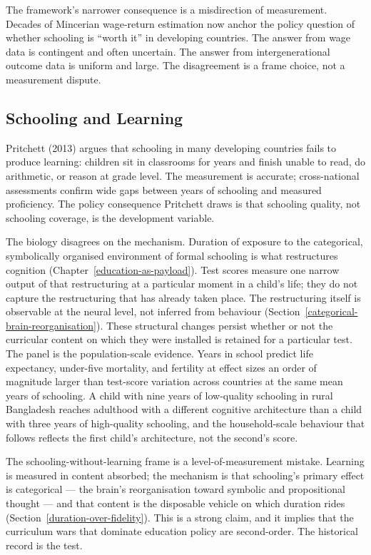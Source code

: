 \documentclass[12pt,letterpaper]{article}
\begin{document}
{The framework's narrower consequence is a misdirection of measurement. Decades of Mincerian wage-return estimation now anchor the policy question of whether schooling is ``worth it'' in developing countries. The answer from wage data is contingent and often uncertain. The answer from intergenerational outcome data is uniform and large. The disagreement is a frame choice, not a measurement dispute.

\subsection{Schooling and Learning}\label{schooling-and-learning}

Pritchett (2013) argues that schooling in many developing countries fails to produce learning: children sit in classrooms for years and finish unable to read, do arithmetic, or reason at grade level. The measurement is accurate; cross-national assessments confirm wide gaps between years of schooling and measured proficiency. The policy consequence Pritchett draws is that schooling quality, not schooling coverage, is the development variable.

The biology disagrees on the mechanism. Duration of exposure to the categorical, symbolically organised environment of formal schooling is what restructures cognition (Chapter~\ref{education-as-payload}). Test scores measure one narrow output of that restructuring at a particular moment in a child's life; they do not capture the restructuring that has already taken place. The restructuring itself is observable at the neural level, not inferred from behaviour (Section~\ref{categorical-brain-reorganisation}). These structural changes persist whether or not the curricular content on which they were installed is retained for a particular test. The panel is the population-scale evidence. Years in school predict life expectancy, under-five mortality, and fertility at effect sizes an order of magnitude larger than test-score variation across countries at the same mean years of schooling. A child with nine years of low-quality schooling in rural Bangladesh reaches adulthood with a different cognitive architecture than a child with three years of high-quality schooling, and the household-scale behaviour that follows reflects the first child's architecture, not the second's score.

The schooling-without-learning frame is a level-of-measurement mistake. Learning is measured in content absorbed; the mechanism is that schooling's primary effect is categorical --- the brain's reorganisation toward symbolic and propositional thought --- and that content is the disposable vehicle on which duration rides (Section~\ref{duration-over-fidelity}). This is a strong claim, and it implies that the curriculum wars that dominate education policy are second-order. The historical record is the test.

}
\end{document}
